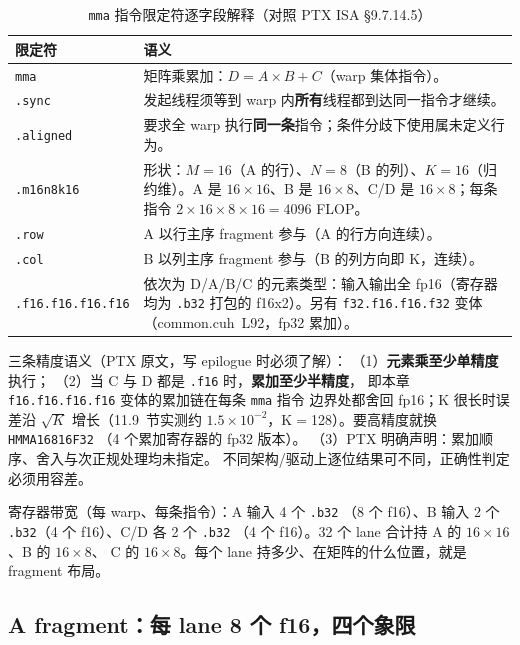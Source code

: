 \begin{table}[htbp]
\centering
\caption{\texttt{mma} 指令限定符逐字段解释（对照 PTX ISA §9.7.14.5）}
\label{tab:11-mma-fields}
\begin{tabular}{lp{10.6cm}}
\toprule
限定符 & 语义 \\
\midrule
\texttt{mma} & 矩阵乘累加：$D = A\times B + C$（warp 集体指令）。 \\
\texttt{.sync} & 发起线程须等到 warp 内\textbf{所有}线程都到达同一指令才继续。 \\
\texttt{.aligned} & 要求全 warp 执行\textbf{同一条}指令；条件分歧下使用属未定义行为。 \\
\texttt{.m16n8k16} & 形状：$M{=}16$（A 的行）、$N{=}8$（B 的列）、$K{=}16$（归约维）。A 是 $16\times16$、B 是 $16\times8$、C/D 是 $16\times8$；每条指令 $2\times16\times8\times16 = 4096$ FLOP。 \\
\texttt{.row} & A 以行主序 fragment 参与（A 的行方向连续）。 \\
\texttt{.col} & B 以列主序 fragment 参与（B 的列方向即 K，连续）。 \\
\texttt{.\allowbreak{}f16.f16.f16.f16} & 依次为 D/A/B/C 的元素类型：输入输出全 fp16（寄存器均为 \texttt{.b32} 打包的 f16x2）。另有 \texttt{f32.f16.f16.f32} 变体（common.cuh~L92，fp32 累加）。 \\
\bottomrule
\end{tabular}
\end{table}

三条精度语义（PTX 原文，写 epilogue 时必须了解）：
（1）\textbf{元素乘至少单精度}执行；
（2）当 C 与 D 都是 \texttt{.f16} 时，\textbf{累加至少半精度}，
即本章 \texttt{f16.f16.f16.f16} 变体的累加链在每条 \texttt{mma} 指令
边界处都舍回 fp16；K 很长时误差沿 $\sqrt{K}$ 增长（11.9~节实测约
$1.5\times10^{-2}$，K$=$128）。要高精度就换 \texttt{HMMA16816\allowbreak{}F32}
（4 个累加寄存器的 fp32 版本）。
（3）PTX 明确声明：累加顺序、舍入与次正规处理均未指定。
不同架构/驱动上逐位结果可不同，正确性判定必须用容差。

寄存器带宽（每 warp、每条指令）：A 输入 4 个 \texttt{.b32}
（8 个 f16）、B 输入 2 个 \texttt{.b32}（4 个 f16）、C/D 各 2 个 \texttt{.b32}
（4 个 f16）。32 个 lane 合计持 A 的 $16\times16$、B 的 $16\times8$、
C 的 $16\times8$。每个 lane 持多少、在矩阵的什么位置，就是 fragment 布局。

\subsection{A fragment：每 lane 8 个 f16，四个象限}

